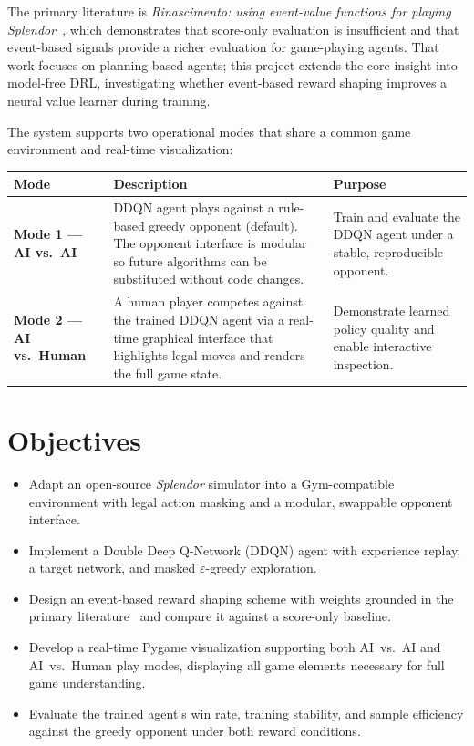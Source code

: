 \documentclass[11pt]{article}
\begin{document}
The primary literature is \textit{Rinascimento: using event-value functions for playing
Splendor}~\cite{bravi2020}, which demonstrates that score-only evaluation is insufficient
and that event-based signals provide a richer evaluation for game-playing agents. That work
focuses on planning-based agents; this project extends the core insight into model-free DRL,
investigating whether event-based reward shaping improves a neural value learner during training.

The system supports two operational modes that share a common game environment and
real-time visualization:

\begin{center}
\renewcommand{\arraystretch}{1.25}
\begin{tabular}{>{\bfseries}p{3.2cm} p{5.0cm} p{5.2cm}}
\toprule
Mode & Description & Purpose \\
\midrule
Mode 1 — AI vs.\ AI
  & DDQN agent plays against a rule-based greedy opponent (default). The opponent
    interface is modular so future algorithms can be substituted without code changes.
  & Train and evaluate the DDQN agent under a stable, reproducible opponent. \\[4pt]
Mode 2 — AI vs.\ Human
  & A human player competes against the trained DDQN agent via a real-time graphical
    interface that highlights legal moves and renders the full game state.
  & Demonstrate learned policy quality and enable interactive inspection. \\
\bottomrule
\end{tabular}
\end{center}

\newpage

\section{Objectives}

\begin{itemize}
  \item Adapt an open-source \textit{Splendor} simulator into a Gym-compatible environment
        with legal action masking and a modular, swappable opponent interface.
  \item Implement a Double Deep Q-Network (DDQN) agent with experience replay, a target
        network, and masked $\varepsilon$-greedy exploration.
  \item Design an event-based reward shaping scheme with weights grounded in the primary
        literature~\cite{bravi2020} and compare it against a score-only baseline.
  \item Develop a real-time Pygame visualization supporting both AI~vs.~AI and
        AI~vs.~Human play modes, displaying all game elements necessary for full
        game understanding.
  \item Evaluate the trained agent's win rate, training stability, and sample efficiency
        against the greedy opponent under both reward conditions.
\end{itemize}
\end{document}
